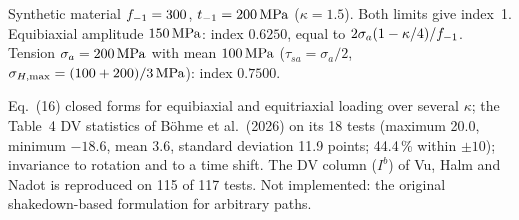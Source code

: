  Synthetic material $f_{-1}=300$, $t_{-1}=200\,\mathrm{MPa}$ ($\kappa=1.5$). Both limits give
index~1. Equibiaxial amplitude $150\,\mathrm{MPa}$: index $0.6250$, equal to $2\sigma_a(1-\kappa/4)/f_{-1}$. Tension
$\sigma_a=200\,\mathrm{MPa}$ with mean $100\,\mathrm{MPa}$ ($\tau_{sa}=\sigma_a/2$, $\sigma_{H,\max}=(100+200)/3\,\mathrm{MPa}$):
index $0.7500$.

 Eq.~(16) closed forms for equibiaxial and equitriaxial loading over several
$\kappa$; the Table~4 DV statistics of B\"ohme et al.\ (2026) on its 18 tests (maximum 20.0,
minimum $-18.6$, mean 3.6, standard deviation 11.9 points; 44.4\,\% within $\pm10$); invariance to
rotation and to a time shift. The DV column ($I^b$) of Vu, Halm and Nadot \cite{vu2010} is reproduced on
115 of 117 tests. Not implemented: the original shakedown-based formulation for arbitrary paths.
